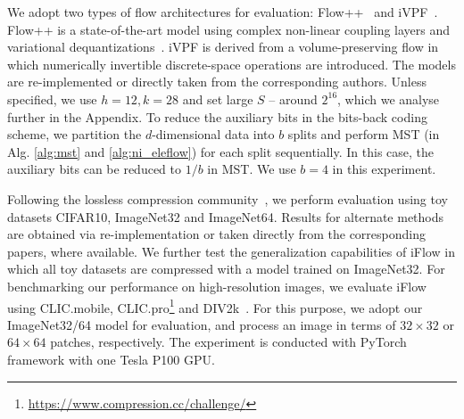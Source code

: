 \documentclass{article}
\begin{document}
We adopt two types of flow architectures for evaluation: Flow++~\cite{ho2019flow++} and iVPF~\cite{zhang2021ivpf}. Flow++ is a state-of-the-art model using complex non-linear coupling layers and variational dequantizations~\cite{hoogeboom2020learning}. iVPF is derived from a volume-preserving flow in which numerically invertible discrete-space operations are introduced. The models are re-implemented or directly taken from the corresponding authors. 
Unless specified, we use $h=12, k=28$ and set large $S$ -- around $2^{16}$, which we analyse further in the Appendix. To reduce the auxiliary bits in the bits-back coding scheme, we partition the $d$-dimensional data into $b$ splits and perform MST (in Alg. \ref{alg:mst} and \ref{alg:ni_eleflow}) for each split sequentially. In this case, the auxiliary bits can be reduced to $1/b$ in MST. We use $b=4$ in this experiment.

Following the lossless compression community~\cite{ho2019flow++,berg2020idf++,hoogeboom2019integer,townsend2019hilloc,zhang2021ivpf}, we perform evaluation using toy datasets CIFAR10, ImageNet32 and ImageNet64. Results for alternate methods are obtained via re-implementation or taken directly from the corresponding papers, where available. We further test the generalization capabilities of iFlow in which all toy datasets are compressed with a model trained on ImageNet32. For benchmarking our performance on high-resolution images, we evaluate iFlow using CLIC.mobile, CLIC.pro\footnote{\url{https://www.compression.cc/challenge/}} and DIV2k~\cite{agustsson2017ntire}. For this purpose, we adopt our ImageNet32/64 model for evaluation, and process an image in terms of $32 \times 32$ or $64 \times 64$ patches, respectively. The experiment is conducted with PyTorch framework with one Tesla P100 GPU.
\end{document}
